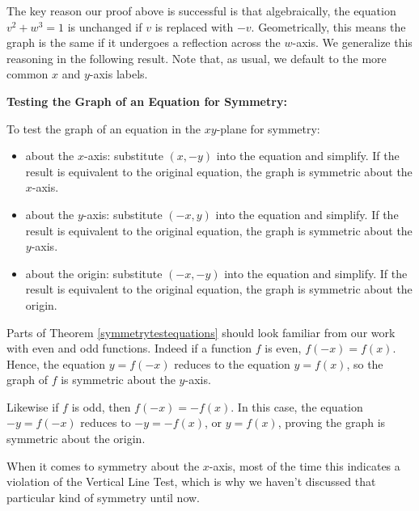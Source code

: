 \documentclass{ximera}
\begin{document}
The key reason our proof above is successful is that algebraically, the equation $v^2+w^3 = 1$ is unchanged if $v$ is replaced with $-v$.  Geometrically, this means the graph is the same if it undergoes a reflection across the $w$-axis. We generalize this reasoning in the following result.  Note that, as usual, we default to the more common $x$ and $y$-axis labels.
  

\begin{theorem} \label{symmetrytestequations} \textbf{Testing the Graph of an Equation for Symmetry:}

To test the graph of an equation in the $xy$-plane for symmetry:

\begin{itemize}

\item about the $x$-axis:  substitute $(x,-y)$ into the equation and simplify. If the result is equivalent to the original equation, the graph is symmetric about the $x$-axis.

\item about the $y$-axis:  substitute $(-x,y)$ into the equation and simplify. If the result is equivalent to the original equation, the graph is symmetric about the $y$-axis.

\item about the origin:  substitute $(-x,-y)$ into the equation and simplify. If the result is equivalent to the original equation, the graph is symmetric about the origin.

\end{itemize}

\end{theorem}




Parts of Theorem  \ref{symmetrytestequations} should look familiar from our work with even and odd functions.  Indeed if a function $f$ is even,   $f(-x) = f(x)$.  Hence, the equation $y=f(-x)$ reduces to the equation $y=f(x)$, so the graph of $f$ is symmetric about the $y$-axis. 

Likewise if $f$ is odd, then  $f(-x) = -f(x)$.  In this case, the equation  $-y = f(-x)$ reduces to  $-y = -f(x)$, or $y = f(x)$, proving the graph is symmetric about the origin.

When it comes to symmetry about the $x$-axis, most of the time this indicates a violation of the Vertical Line Test, which is why we haven't discussed that particular kind of symmetry until now.  
\end{document}
